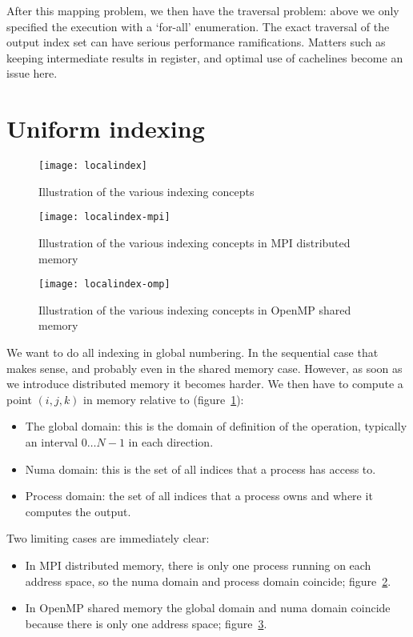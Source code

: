 \documentclass[11pt,fleqn,preprint]{impreport}
\begin{document}
After this mapping problem, we then have the traversal problem: above we only specified the
execution with a `for-all' enumeration. The exact traversal of the output index set can have
serious performance ramifications. Matters such as keeping intermediate results in register,
and optimal use of cachelines become an issue here.

\section{Uniform indexing}

\begin{figure}[ht]
  \texttt{[image: localindex]}
  \caption{Illustration of the various indexing concepts}
  \label{fig:localindex}
\end{figure}
\begin{figure}[ht]
  \texttt{[image: localindex-mpi]}
  \caption{Illustration of the various indexing concepts in MPI
    distributed memory}
  \label{fig:localindex-mpi}
\end{figure}
\begin{figure}[ht]
  \texttt{[image: localindex-omp]}
  \caption{Illustration of the various indexing concepts in OpenMP
    shared memory}
  \label{fig:localindex-omp}
\end{figure}

We want to do all indexing in global numbering. In the sequential case
that makes sense, and probably even in the shared memory
case. However, as soon as we introduce distributed memory it becomes
harder. We then have to compute a point $(i,j,k)$ in memory relative
to (figure~\ref{fig:localindex}):
\begin{itemize}
\item The global domain: this is the domain of definition of the
  operation, typically an interval $0\ldots N-1$ in each direction.
\item Numa domain: this is the set of all indices that a process has
  access to.
\item Process domain: the set of all indices that a process owns and
  where it computes the output.
\end{itemize}

Two limiting cases are immediately clear:
\begin{itemize}
\item In MPI distributed memory, there is only one process running on each
  address space, so the numa domain and process domain coincide;
  figure~\ref{fig:localindex-mpi}.
\item In OpenMP shared memory the global domain and numa domain
  coincide because there is only one address space; figure~\ref{fig:localindex-omp}.
\end{itemize}
\end{document}
